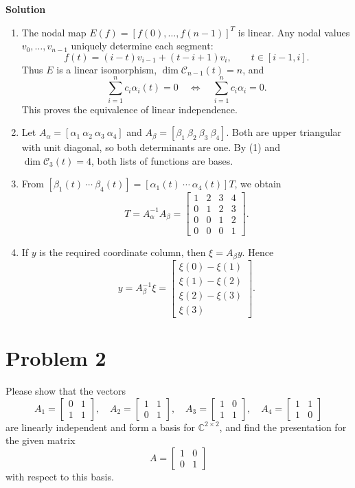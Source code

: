 \documentclass[UTF8,10pt,letterpaper,fontset=fandol]{ctexart}
\newcommand{\C}{\mathbb C}
\newcommand{\Solution}{\par\Needspace{5\baselineskip}\textbf{Solution}\par}
\begin{document}
\Solution
\begin{enumerate}
\item The nodal map \(E(f)=[f(0),\ldots,f(n-1)]^T\) is linear.
Any nodal values \(v_0,\ldots,v_{n-1}\) uniquely determine each segment:
\[
f(t)=(i-t)v_{i-1}+(t-i+1)v_i,\qquad t\in[i-1,i].
\]
Thus \(E\) is a linear isomorphism, \(\dim\mathcal C_{n-1}(t)=n\), and
\[
\sum_{i=1}^n c_i\alpha_i(t)=0
\quad\Longleftrightarrow\quad
\sum_{i=1}^n c_i\alpha_i=0.
\]
This proves the equivalence of linear independence.
\item Let \(A_\alpha=[\alpha_1\ \alpha_2\ \alpha_3\ \alpha_4]\) and
\(A_\beta=[\beta_1\ \beta_2\ \beta_3\ \beta_4]\).
Both are upper triangular with unit diagonal, so both determinants are one.
By (1) and \(\dim\mathcal C_3(t)=4\), both lists of functions are bases.
\item From \([\beta_1(t)\ \cdots\ \beta_4(t)]
=[\alpha_1(t)\ \cdots\ \alpha_4(t)]T\), we obtain
\[
\boxed{T=A_\alpha^{-1}A_\beta=
\begin{bmatrix}
1&2&3&4\\
0&1&2&3\\
0&0&1&2\\
0&0&0&1
\end{bmatrix}}.
\]
\item If \(y\) is the required coordinate column, then \(\xi=A_\beta y\). Hence
\[
\boxed{y=A_\beta^{-1}\xi=
\begin{bmatrix}
\xi(0)-\xi(1)\\
\xi(1)-\xi(2)\\
\xi(2)-\xi(3)\\
\xi(3)
\end{bmatrix}}.
\]
\end{enumerate}

\section{Problem 2}
Please show that the vectors
\[
A_1=\begin{bmatrix}0&1\\1&1\end{bmatrix},\quad
A_2=\begin{bmatrix}1&1\\0&1\end{bmatrix},\quad
A_3=\begin{bmatrix}1&0\\1&1\end{bmatrix},\quad
A_4=\begin{bmatrix}1&1\\1&0\end{bmatrix}
\]
are linearly independent and form a basis for \(\C^{2\times2}\), and find the
presentation for the given matrix
\[
A=\begin{bmatrix}1&0\\0&1\end{bmatrix}
\]
with respect to this basis.
\end{document}
